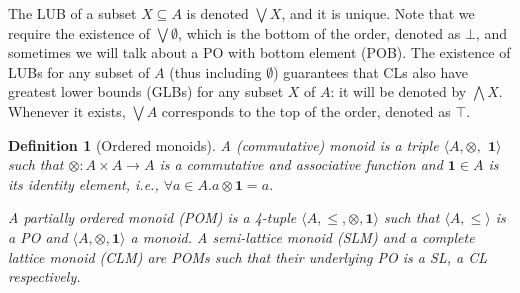 \documentclass[a4paper]{elsarticle}
\newtheorem{definition}{Definition}
\newcommand{\monop}{\otimes}
\newcommand{\1}{\mathbf{1}}
\begin{document}
The LUB of a subset $X \subseteq A$ is denoted $\bigvee X$, and it is unique. 
Note that we require the existence of $\bigvee \emptyset$, which is the bottom
of the order, denoted as $\bot$, and sometimes we will talk about a PO with bottom element
(POB).
The existence of LUBs for any subset of $A$ (thus including $\emptyset$) guarantees that 
CLs also have greatest lower bounds (GLBs) for any subset $X$ of $A$: 
it will be denoted by $\bigwedge X$. 
Whenever it exists, 
$\bigvee A$ corresponds to the top of the order, denoted as $\top$.
%

%



%
%

\begin{definition}[Ordered monoids]\label{defn:clm}
	A (commutative) monoid is a triple
	$\langle A, \monop,$ $\1 \rangle$ such that $\monop: A \times A \rightarrow A$ is
	a commutative and associative function and $\1 \in A$ is its \emph{identity} element,
	i.e., $\forall a \in A. a \monop \1 = a$.
	
	A partially ordered monoid (POM) is a 4-tuple
	$\langle A, \leq, \monop, \1 \rangle$ such that 	
	$\langle A, \leq \rangle$ is a PO and $\langle A, \monop, \1 \rangle$ a monoid.
	A semi-lattice monoid (SLM) and a complete lattice monoid (CLM) are 
	POMs such that their underlying PO is a SL, a CL respectively.
\end{definition}
\end{document}
